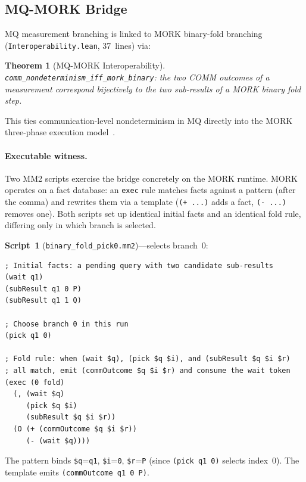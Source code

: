 \documentclass[11pt]{article}
\newtheorem{theorem}{Theorem}[section]
\theoremstyle{definition}
\theoremstyle{remark}
\begin{document}
\subsection{MQ-MORK Bridge}

MQ measurement branching is linked to MORK binary-fold branching
(\texttt{Interoperability.lean}, 37~lines) via:

\begin{theorem}[MQ-MORK Interoperability]
\texttt{comm\_nondeterminism\_iff\_mork\_binary}: the two COMM outcomes
of a measurement correspond bijectively to the two sub-results of
a MORK binary fold step.
\end{theorem}

\noindent
This ties communication-level nondeterminism in MQ directly into the
MORK three-phase execution model~\cite{MeredithStayOSLF2020}.

\paragraph{Executable witness.}
Two MM2 scripts exercise the bridge concretely on the MORK runtime.
MORK operates on a fact database: an \texttt{exec} rule matches facts
against a pattern (after the comma) and rewrites them via a template
(\texttt{(+ ...)} adds a fact, \texttt{(- ...)} removes one).
Both scripts set up identical initial facts and an identical fold rule,
differing only in which branch is selected.

\smallskip\noindent
\textbf{Script~1} (\texttt{binary\_fold\_pick0.mm2})---selects branch~0:

\begin{lstlisting}[caption={Pick outcome 0 (from \texttt{binary\_fold\_pick0.mm2})}]
; Initial facts: a pending query with two candidate sub-results
(wait q1)
(subResult q1 0 P)
(subResult q1 1 Q)

; Choose branch 0 in this run
(pick q1 0)

; Fold rule: when (wait $q), (pick $q $i), and (subResult $q $i $r)
; all match, emit (commOutcome $q $i $r) and consume the wait token
(exec (0 fold)
  (, (wait $q)
     (pick $q $i)
     (subResult $q $i $r))
  (O (+ (commOutcome $q $i $r))
     (- (wait $q))))
\end{lstlisting}

\noindent
The pattern binds \texttt{\$q}=\texttt{q1},
\texttt{\$i}=\texttt{0}, \texttt{\$r}=\texttt{P} (since
\texttt{(pick q1 0)} selects index~0).  The template emits
\texttt{(commOutcome q1 0 P)}.
\end{document}
